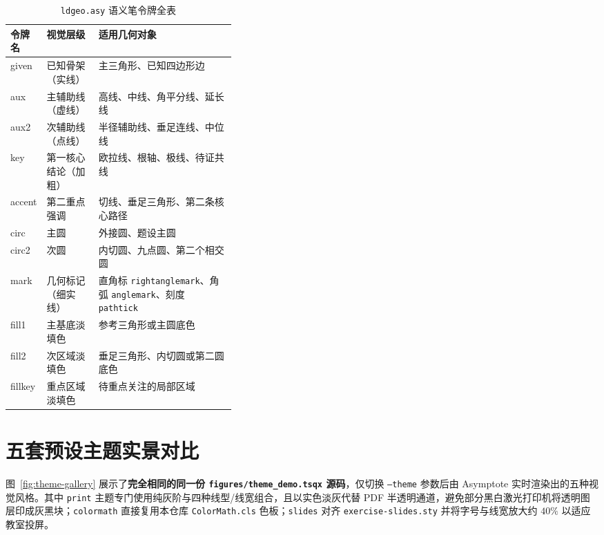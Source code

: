 \documentclass[11pt,oneside,fontset=none]{ctexbook}
\newcommand{\code}[1]{\texttt{#1}}
\begin{document}
\begin{table}[htbp]
  \centering
  \caption{\texttt{ldgeo.asy} 语义笔令牌全表}
  \label{tab:semantic-tokens}
  \small
  \begin{tabularx}{\linewidth}{@{}>{\ttfamily}p{0.15\linewidth}p{0.23\linewidth}X@{}}
    \toprule
    令牌名 & 视觉层级 & 适用几何对象 \\
    \midrule
    given & 已知骨架（实线） & 主三角形、已知四边形边 \\
    aux & 主辅助线（虚线） & 高线、中线、角平分线、延长线 \\
    aux2 & 次辅助线（点线） & 半径辅助线、垂足连线、中位线 \\
    key & 第一核心结论（加粗） & 欧拉线、根轴、极线、待证共线 \\
    accent & 第二重点强调 & 切线、垂足三角形、第二条核心路径 \\
    circ & 主圆 & 外接圆、题设主圆 \\
    circ2 & 次圆 & 内切圆、九点圆、第二个相交圆 \\
    mark & 几何标记（细实线） & 直角标 \code{rightanglemark}、角弧 \code{anglemark}、刻度 \code{pathtick} \\
    fill1 & 主基底淡填色 & 参考三角形或主圆底色 \\
    fill2 & 次区域淡填色 & 垂足三角形、内切圆或第二圆底色 \\
    fillkey & 重点区域淡填色 & 待重点关注的局部区域 \\
    \bottomrule
  \end{tabularx}
\end{table}

\section{五套预设主题实景对比}

图~\ref{fig:theme-gallery} 展示了\textbf{完全相同的同一份 \code{figures/theme\_demo.tsqx} 源码}，仅切换 \code{--theme} 参数后由 Asymptote 实时渲染出的五种视觉风格。其中 \code{print} 主题专门使用纯灰阶与四种线型/线宽组合，且以实色淡灰代替 PDF 半透明通道，避免部分黑白激光打印机将透明图层印成灰黑块；\code{colormath} 直接复用本仓库 \code{ColorMath.cls} 色板；\code{slides} 对齐 \code{exercise-slides.sty} 并将字号与线宽放大约 \(40\%\) 以适应教室投屏。
\end{document}
